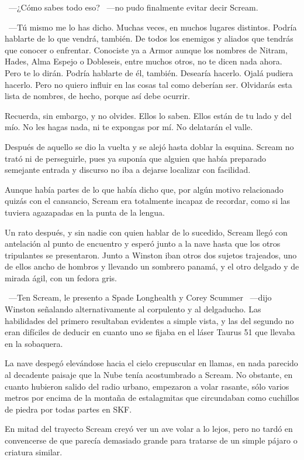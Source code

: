 ~---¿Cómo sabes todo eso? ~---no pudo finalmente evitar decir Scream.

~---Tú mismo me lo has dicho. Muchas veces, en muchos lugares distintos. Podría hablarte de lo que vendrá, también. De todos los enemigos y aliados que tendrás que conocer o enfrentar. Conociste ya a Armor aunque los nombres de Nitram, Hades, Alma Espejo o Dobleseis, entre muchos otros, no te dicen nada ahora. Pero te lo dirán. Podría hablarte de él, también. Desearía hacerlo. Ojalá pudiera hacerlo. Pero no quiero influir en las cosas tal como deberían ser. Olvidarás esta lista de nombres, de hecho, porque así debe ocurrir.

\rquoti Recuerda, sin embargo, y no olvides. Ellos lo saben. Ellos están de tu lado y del mío. No les hagas nada, ni te expongas por mí. No delatarán el valle.

Después de aquello se dio la vuelta y se alejó hasta doblar la esquina. Scream no trató ni de perseguirle, pues ya suponía que alguien que había preparado semejante entrada y discurso no iba a dejarse localizar con facilidad.

Aunque había partes de lo que había dicho que, por algún motivo relacionado quizás con el cansancio, Scream era totalmente incapaz de recordar, como si las tuviera agazapadas en la punta de la lengua.

\parbreak
Un rato después, y sin nadie con quien hablar de lo sucedido, Scream llegó con antelación al punto de encuentro y esperó junto a la nave hasta que los otros tripulantes se presentaron. Junto a Winston iban otros dos sujetos trajeados, uno de ellos ancho de hombros y llevando un sombrero panamá, y el otro delgado y de mirada ágil, con un fedora gris.

~---Ten Scream, le presento a Spade Longhealth y Corey Scummer ~---dijo Winston señalando alternativamente al corpulento y al delgaducho. Las habilidades del primero resultaban evidentes a simple vista, y las del segundo no eran difíciles de deducir en cuanto uno se fijaba en el láser Taurus 51 que llevaba en la sobaquera.

La nave despegó elevándose hacia el cielo crepuscular en llamas, en nada parecido al decadente paisaje que la Nube tenía acostumbrado a Scream. No obstante, en cuanto hubieron salido del radio urbano, empezaron a volar rasante, sólo varios metros por encima de la montaña de estalagmitas que circundaban como cuchillos de piedra por todas partes en SKF.

En mitad del trayecto Scream creyó ver un ave volar a lo lejos, pero no tardó en convencerse de que parecía demasiado grande para tratarse de un simple pájaro o criatura similar.

